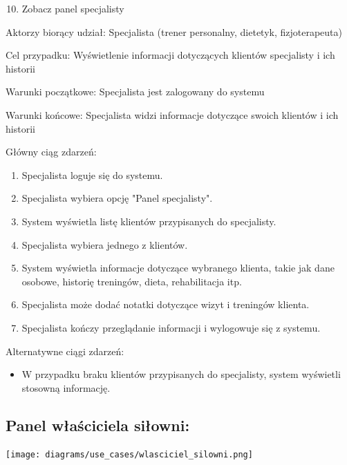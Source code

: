 \documentclass[
]{article}
\providecommand{\tightlist}{%
  \setlength{\itemsep}{0pt}\setlength{\parskip}{0pt}}
\begin{document}
\begin{enumerate}
\setcounter{enumi}{9}
\tightlist
\item
  {Zobacz panel specjalisty}
\end{enumerate}

{Aktorzy biorący udział: Specjalista (trener personalny, dietetyk,
fizjoterapeuta)}

{Cel przypadku: Wyświetlenie informacji dotyczących klientów specjalisty
i ich historii}

{Warunki początkowe: Specjalista jest zalogowany do systemu}

{Warunki końcowe: Specjalista widzi informacje dotyczące swoich klientów
i ich historii}

{Główny ciąg zdarzeń:}

\begin{enumerate}
\tightlist
\item
  {Specjalista loguje się do systemu.}
\item
  {Specjalista wybiera opcję "Panel specjalisty".}
\item
  {System wyświetla listę klientów przypisanych do specjalisty.}
\item
  {Specjalista wybiera jednego z klientów.}
\item
  {System wyświetla informacje dotyczące wybranego klienta, takie jak
  dane osobowe, historię treningów, dieta, rehabilitacja itp.}
\item
  {Specjalista może dodać notatki dotyczące wizyt i treningów klienta.}
\item
  {Specjalista kończy przeglądanie informacji i wylogowuje się z
  systemu.}
\end{enumerate}

{Alternatywne ciągi zdarzeń:}

\begin{itemize}
\tightlist
\item
  {W przypadku braku klientów przypisanych do specjalisty, system
  wyświetli stosowną informację.}
\end{itemize}

{}

\hypertarget{h.2ol8m2kl4itm}{%
\subsection{\texorpdfstring{{Panel właściciela
siłowni:}}{Panel właściciela siłowni:}}\label{h.2ol8m2kl4itm}}

{\texttt{[image: diagrams/use\_cases/wlasciciel\_silowni.png]}}
\end{document}
